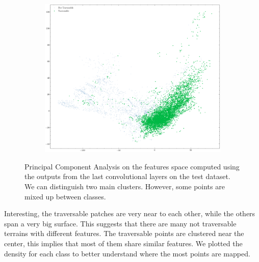 \documentclass[../document.tex]{subfiles}
\begin{document}
\begin{figure} [htbp]
\begin{subfigure}[b]{0.48\textwidth}
    \end{subfigure}
    \begin{subfigure}[b]{0.48\textwidth}
        \includegraphics[width=\linewidth]{../img/5/pca/pca-test-1.png}
    \end{subfigure}
    \caption{Principal Component Analysis on the features space computed using the outputs from the last convolutional layers on the test dataset. We can distinguish two main clusters. However, some points are mixed up between classes.  }
    \label{fig : pca-test-set}
\end{figure}
Interesting, the traversable patches are very near to each other, while the others span a very big surface. This suggests that there are many not traversable terrains with different features. The traversable points are clustered near the center, this implies that most of them share similar features. We plotted the density for each class to better understand where the most points are mapped.
\end{document}
